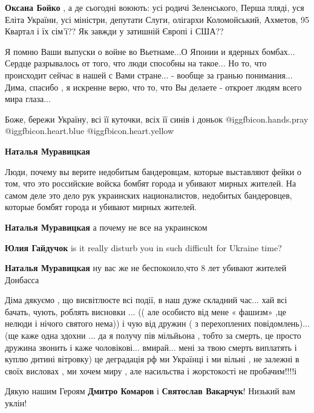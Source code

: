 \begin{itemize}
\begin{itemize}
\textbf{Оксана Бойко} , а де сьогодні воюють: усі родичі Зеленського, Перша πляді, уся Еліта України, усі міністри, депутати Слуги, олігархи Коломойський, Ахметов, 95 Квартал і їх сім'ї??
Як завжди у затишній Європі і США??
\end{itemize} %


Я помню Ваши выпуски о войне во Вьетнаме...О Японии и ядерных бомбах... Сердце
разрывалось от того, что люди способны на такое... Но то, что происходит сейчас
в нашей с Вами стране... - вообще за гранью понимания... Дима, спасибо , я
искренне верю, что то, что Вы делаете - откроет людям всего мира глаза...

Боже, бережи Україну, всі її куточки, всіх її синів і доньок @igg{fbicon.hands.pray}  @igg{fbicon.heart.blue}  @igg{fbicon.heart.yellow} 

\begin{itemize} %
\textbf{Наталья Муравицкая} 

Люди, почему вы верите недобитым бандеровцам, которые выставляют фейки о том,
что это российские войска бомбят города и убивают мирных жителей. На самом деле
это дело рук украинских националистов, недобитых бандеровцев, которые бомбят
города и убивают мирных жителей.

\textbf{Наталья Муравицкая} а почему не все на украинском

\textbf{Юлия Гайдучок} is it really disturb you in such difficult for Ukraine time?

\textbf{Наталья Муравицкая} ну вас же не беспокоило,что 8 лет убивают жителей Донбасса
\end{itemize} %


Діма дякуємо , що висвітлюєте всі події, в наш дуже складний час... хай всі
бачать, чують, роблять висновки ... (( але особисто від мене « фашизм» ,це нелюди
і нічого святого нема)) і чую від дружин ( з перехоплених повідомлень)... (ще
каже одна здохни ... да я получу пів мільйьона , тобто за смерть, це просто
дружина звонить і каже чоловікові... вмирай... мені за твою смерть виплатять і
куплю дитині вітровку) це деградація рф ми Українці і ми вільні , не залежні в
своїх висловах , ми хочем миру , але насильства і жорстокості не пробачим!!!!і

Дякую нашим Героям \textbf{Дмитро Комаров} і \textbf{Святослав Вакарчук}! Низький вам уклін!


\end{itemize}
